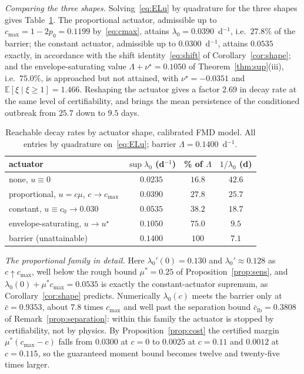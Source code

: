 \documentclass[letterpaper, 10pt, conference]{ieeeconf}
\newcommand{\E}{\mathbb{E}}
\newcommand{\Lbar}{\Lambda}
\newcommand{\rev}[1]{#1}
\newcommand{\pl}[1]{#1}
\begin{document}
\emph{\pl{Comparing the three shapes.}} Solving~\eqref{eq:ELu} by quadrature for the three
shapes gives Table~\ref{tab:ladder}. The proportional actuator, admissible up to
$c_{\max}=1-2p_0=0.1199$ by~\eqref{eq:cmax}, attains
$\lambda_0=0.0390$~d$^{-1}$, i.e.\ $27.8\%$ of the barrier; the constant
actuator, admissible up to $0.0300$~d$^{-1}$, attains $0.0535$ exactly, in
accordance with the shift identity~\eqref{eq:shift} of
Corollary~\ref{cor:shape}; \rev{and the envelope-saturating value
$\Lbar+\nu^\star=0.1050$ of Theorem~\ref{thm:sup}(iii), i.e.\ $75.0\%$, is
approached but not attained, with $\nu^\star=-0.0351$ and
$\E[\xi\mid\xi\ge1]=1.466$.} \pl{Reshaping the actuator gives a factor $2.69$ in
decay rate at the same level of certifiability, and brings the mean persistence
of the conditioned outbreak from $25.7$ down to $9.5$ days.}
\begin{table}[t]
\centering
\caption{Reachable decay rates by actuator shape, calibrated FMD model. All
entries by quadrature on~\eqref{eq:ELu}; barrier $\Lbar=0.1400$~d$^{-1}$.}
\label{tab:ladder}
\footnotesize
\setlength{\tabcolsep}{4pt}
\begin{tabular}{@{}lccc@{}}
\hline
actuator & $\sup\lambda_0$ (d$^{-1}$) & \% of $\Lbar$ & $1/\lambda_0$ (d)\\
\hline
none, $u\equiv0$                       & $0.0235$ & $16.8$ & $42.6$\\
proportional, $u=c\mu$, $c\to c_{\max}$ & $0.0390$ & $27.8$ & $25.7$\\
constant, $u\equiv c_0\to0.030$         & $0.0535$ & $38.2$ & $18.7$\\
envelope-saturating, $u\to u^\star$     & $0.1050$ & $75.0$ & $9.5$\\
\hline
barrier (unattainable)                  & $0.1400$ & $100$  & $7.1$\\
\hline
\end{tabular}
\end{table}

\emph{The proportional family in detail.} Here $\lambda_0'(0)=0.130$ and
$\lambda_0'\approx0.128$ as $c\uparrow c_{\max}$, well below the \pl{rough} bound
$\mu^\ast=0.25$ of Proposition~\ref{prop:sens}, and
$\lambda_0(0)+\mu^\ast c_{\max}=0.0535$ is exactly the constant-actuator
supremum, as Corollary~\ref{cor:shape} predicts. Numerically $\lambda_0(c)$
meets the barrier only at $\bar c=0.9353$, about $7.8$ times $c_{\max}$ and well
past the separation bound $\bar c_{\mathrm{lb}}=0.3808$ of
\rev{Remark~\ref{prop:separation}}: within this family the actuator is stopped
by certifiability, not by physics. By Proposition~\ref{prop:cost} the certified
margin $\mu^\ast(c_{\max}-c)$ falls from $0.0300$ at $c=0$ to $0.0025$ at
$c=0.11$ and $0.0012$ at $c=0.115$, \rev{\pl{so the guaranteed moment bound
becomes twelve and twenty-five times larger}}.
\end{document}
